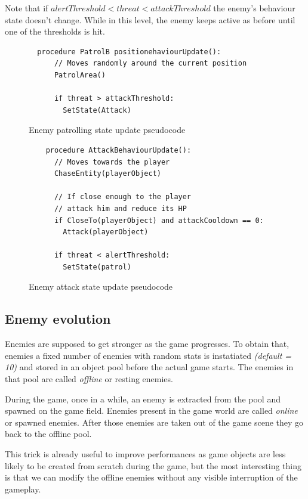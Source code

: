 \documentclass[11pt]{article}
\begin{document}
Note that if $alertThreshold < threat < attackThreshold$ the enemy's behaviour state doesn't change. While in this level, the enemy keeps active as before until one of the thresholds is hit.

\FloatBarrier

\begin{figure}
  \begin{lstlisting}
  procedure PatrolB positionehaviourUpdate():
      // Moves randomly around the current position
      PatrolArea() 

      if threat > attackThreshold:
        SetState(Attack)
  \end{lstlisting}
  \caption{Enemy patrolling state update pseudocode}
\end{figure}

\begin{figure}
  \begin{lstlisting}
    procedure AttackBehaviourUpdate():
      // Moves towards the player
      ChaseEntity(playerObject) 

      // If close enough to the player
      // attack him and reduce its HP
      if CloseTo(playerObject) and attackCooldown == 0: 
        Attack(playerObject)

      if threat < alertThreshold: 
        SetState(patrol)
  \end{lstlisting}
  \caption{Enemy attack state update pseudocode}
\end{figure}

\FloatBarrier

\subsection{Enemy evolution}
Enemies are supposed to get stronger as the game progresses.
To obtain that, enemies a fixed number of enemies with random stats is instatiated \textit{(default = 10)} and stored in an object pool before the actual game starts. The enemies in that pool are called \textit{offline} or resting enemies.

During the game, once in a while, an enemy is extracted from the pool and spawned on the game field. Enemies present in the game world are called \textit{online} or spawned enemies. After those enemies are taken out of the game scene they go back to the offline pool.

This trick is already useful to improve performances as game objects are less likely to be created from scratch during the game, but the most interesting thing is that we can modify the offline enemies without any visible interruption of the gameplay.
\end{document}
